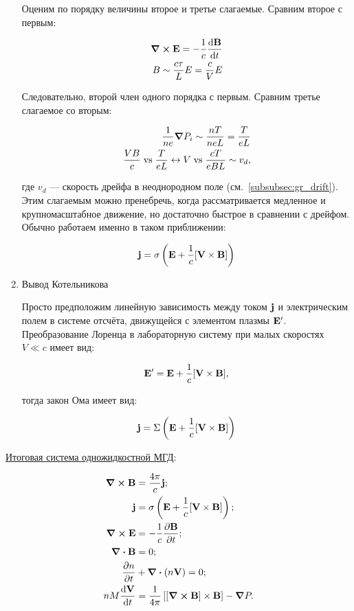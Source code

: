 \documentclass[10pt, a4paper]{article}
\begin{document}
\begin{enumerate}
Оценим по порядку величины второе и третье слагаемые. Сравним второе с первым:

\begin{align*}
	\curl\vb{E} = -\frac{1}{c}\dv{\vb{B}}{t} \\
	B \sim \frac{c\tau}{L} E = \frac{c}{V} E
\end{align*}

Следовательно, второй член одного порядка с первым. Сравним третье слагаемое со вторым:

\begin{align*}
	\frac{1}{n e}\grad P_i \sim \frac{n T}{n e L} = \frac{T}{eL} \\
	\frac{VB}{c}\;\text{vs}\;\frac{T}{eL} \leftrightarrow V\;\text{vs}\;\frac{cT}{eBL} \sim v_{d},
\end{align*}

где $v_{d}$ --- скорость дрейфа в неоднородном поле (см.~\ref{subsubsec:gr_drift}). Этим слагаемым можно пренебречь, когда рассматривается медленное и крупномасштабное движение, но достаточно быстрое в сравнении с дрейфом. Обычно работаем именно в таком приближении:

\begin{equation*}
	\vb{j} = \sigma \left( \vb{E} + \frac{1}{c}[\vb{V}\times\vb{B}]\right)
\end{equation*}

\item Вывод Котельникова~\cite{kotelnikov}

Просто предположим линейную зависимость между током $\vb{j}$ и электрическим полем в системе отсчёта, движущейся с элементом плазмы $\vb{E}'$. Преобразование Лоренца в лабораторную систему при малых скоростях $V \ll c$ имеет вид:

\begin{equation*}
	\vb{E}' = \vb{E} + \frac{1}{c}[\vb{V}\times \vb{B}],
\end{equation*}

тогда закон Ома имеет вид:

\begin{equation*}
	\vb{j} = \Sigma\left( \vb{E} + \frac{1}{c}[\vb{V}\times \vb{B}] \right)
\end{equation*}

\end{enumerate}

\uline{Итоговая система одножидкостной МГД}:

\begin{align}
	\label{eq:MHD_curlB_eq} \curl{\vb{B}} &= \frac{4\pi}{c}\vb{j};\\
	\label{eq:MHD_Ohm_eq} \vb{j} &= \sigma\left(\vb{E} + \frac{1}{c}[\vb{V}\times\vb{B}] \right); \\
	\curl{\vb{E}} &= -\frac{1}{c}\pdv{\vb{B}}{t}; \\
	\div{\vb{B}} &= 0; \\
	\pdv{n}{t} &+ \div{\left(n\vb{V}\right)} = 0; \\
	\label{eq:MHD_motion_eq} n M \dv{\vb{V}}{t} &= \frac{1}{4\pi}\left[\left[\curl{\vb{B}} \right]\times\vb{B}\right]-\grad{P}. 
\end{align}
\end{document}
